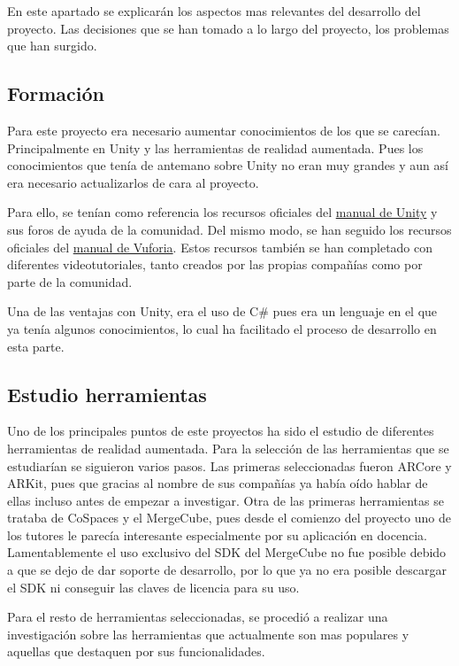 En este apartado se explicarán los aspectos mas relevantes del desarrollo del proyecto. Las decisiones que se han tomado a lo largo del proyecto, los problemas que han surgido.

\subsection{Formación}
Para este proyecto era necesario aumentar conocimientos de los que se carecían. Principalmente en  Unity y las herramientas de realidad aumentada. Pues los conocimientos que tenía de antemano sobre Unity no eran muy grandes y aun así era necesario actualizarlos de cara al proyecto.

Para ello, se tenían como referencia los recursos oficiales del \href{https://docs.unity3d.com/2019.2/Documentation/Manual/UnityManual.html}{manual de Unity} y sus foros de ayuda de la comunidad. Del mismo modo, se han seguido los recursos oficiales del \href{https://library.vuforia.com/getting-started/overview.html}{manual de Vuforia}. Estos recursos también se han completado con diferentes videotutoriales, tanto creados por las propias compañías como por parte de la comunidad.

Una de las ventajas con Unity, era el uso de C\# pues era un lenguaje en el que ya tenía algunos conocimientos, lo cual ha facilitado el proceso de desarrollo en esta parte. 

\subsection{Estudio herramientas}
Uno de los principales puntos de este proyectos ha sido el estudio de diferentes herramientas de realidad aumentada. Para la selección de las herramientas que se estudiarían se siguieron varios pasos. 
Las primeras seleccionadas fueron ARCore y ARKit, pues que gracias al nombre de sus compañías ya había oído hablar de ellas incluso antes de empezar a investigar. Otra de las primeras herramientas se trataba de CoSpaces y el MergeCube, pues desde el comienzo del proyecto uno de los tutores le parecía interesante especialmente por su aplicación en docencia. Lamentablemente el uso exclusivo del SDK del MergeCube no fue posible debido a que se dejo de dar soporte de desarrollo, por lo que ya no era posible descargar el SDK ni conseguir las claves de licencia para su uso.

Para el resto de herramientas seleccionadas, se procedió a realizar una investigación sobre las herramientas que actualmente son mas populares y aquellas que destaquen por sus funcionalidades.

